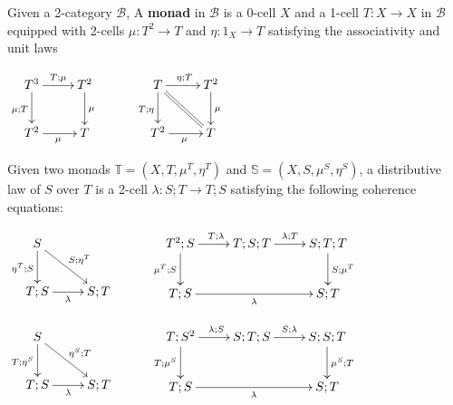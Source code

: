 \begin{definition}
\label{def:monad}
%

Given a 2-category $\mathcal B$,  A {\bf monad} in $\mathcal B$ is a 0-cell $X$ and a 1-cell $T:X\to X$ in $\mathcal B$ equipped with 2-cells $\mu:T^2 \to T$ and $\eta:1_X\to T$ satisfying the associativity and unit laws


\hfil$
\xymatrix{
T^3 \ar[r]^{T;\mu} \ar[d]_{\mu; T}
  & T^2 \ar[d]^\mu\\
T^2\ar[r]_{\mu} & T
}
\hspace*{1cm}
\xymatrix{
T \ar[r]^{\eta; T} \ar[d]_{ T;\eta} \ar@{=}[dr] & T^2 \ar[d]^\mu\\
T^2 \ar[r]_{\mu} & T
}
$

%
%
%
\end{definition}



\begin{definition}
Given two monads $\mathbb{T}=(X,T,\mu^T, \eta^T)$ and $\mathbb{S}=(X,S,\mu^S, \eta^S)$, a distributive law of $S$ over $T$ is a 2-cell $\lambda:S;T\to T;S$ satisfying the following coherence equations:


\hfil
$
\xymatrix{
S \ar[dr]^{S;\eta^T} \ar[d]_{\eta^T;S}\\
 T;S \ar[r]_{\lambda}
 & S;T
}
\hspace*{1cm}
\xymatrix{
T^2;S \ar[r]^{T;\lambda} \ar[d]_{\mu^T;S}
 & T;S;T \ar[r]^{\lambda;T}
  & S;T;T \ar[d]^{S;\mu^T}\\
T;S \ar[rr]_{\lambda}
  & 
  &S;T
}
$

\hfil
$
\xymatrix{
S \ar[dr]^{\eta^S;T} \ar[d]_{T;\eta^S}\\
 T;S \ar[r]_{\lambda}
 & S;T
}
\hspace*{1cm}
\xymatrix{
T;S^2 \ar[r]^{\lambda;S} \ar[d]_{T;\mu^S}
 & S;T;S \ar[r]^{S;\lambda}
  & S;S;T \ar[d]^{\mu^S;T}\\
T;S \ar[rr]_{\lambda}
  & 
  &S;T
}
$
\end{definition}


